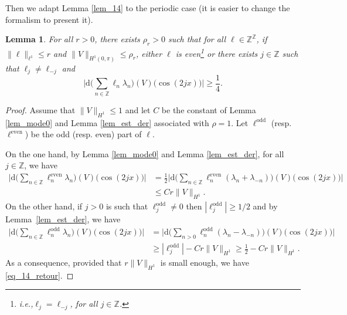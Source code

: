 \documentclass[11pt]{article}
\newcommand{\ie}{i.e.,\xspace}
\newcommand{\resp}{resp.\xspace}
\let\ts\textstyle
\newtheorem{lemma}[theorem]{Lemma}
\theoremstyle{definition}
\begin{document}
Then we adapt Lemma \ref{lem_14} to the periodic case (it is easier to change the formalism to present it).
\begin{lemma}
\label{lem_14_per}
For all $r>0$, there exists $\rho_r>0$ such that for all $\ell \in \mathbb{Z}^{\mathbb{Z}} $, if $\|\ell\|_{\ell^1}\leq r$ and $\|V\|_{H^1(0,\pi)}\leq \rho_r$, either $\ell$ is even\footnote{\ie $\ell_j=\ell_{-j}$, for all $j\in \mathbb{Z}$.} or there exists $j\in\mathbb{Z}$ such that $\ell_j \neq \ell_{-j}$ and%
\begin{equation}
\label{eq_14_retour}
\bigl|\mathrm{d}\bigl(\ts\sum_{n \in \mathbb{Z}} \ell_n \lambda_n)(V)(\cos(2jx)\bigr) \bigr| \geq \dfrac14.
\end{equation}
\end{lemma}
\begin{proof} Assume that $\|V\|_{H^1}\leq 1$ and let $C$ be the constant of Lemma \ref{lem_mode0} and Lemma \ref{lem_est_der} associated with $\rho =1$.
Let $\ell^{\mathrm{odd}}$ (\resp $\ell^{\mathrm{even}}$) be the odd (\resp even) part of $\ell$.

On the one hand, by Lemma \ref{lem_mode0} and Lemma \ref{lem_est_der}, for all $j\in \mathbb{Z}$, we have
\begin{equation*}
\begin{split}
\bigl |\mathrm{d} \bigl(\ts\sum_{n \in \mathbb{Z}} \ell_n^{\mathrm{even}} \lambda_n)(V)(\cos(2jx) \bigr) \bigr| &=\frac12 \bigl |\mathrm{d} \bigl(\ts\sum_{n \in \mathbb{Z}} \ell_n^{\mathrm{even}} (\lambda_n+\lambda_{-n}))(V)(\cos(2jx) \bigr) \bigr| \\ &\leq C r \|V\|_{H^1}.
\end{split}
\end{equation*}
On the other hand, if $j>0$ is such that $\ell^{\mathrm{odd}}_j \neq 0$ then $|\ell^{\mathrm{odd}}_j|\geq 1/2$ and by Lemma~\ref{lem_est_der}, we have
\begin{equation*}
\begin{split}
\bigl |\mathrm{d} \bigl(\ts\sum_{n \in \mathbb{Z}} \ell_n^{\mathrm{odd}} \lambda_n)(V)(\cos(2jx) \bigr) \bigr | &= \bigl |\mathrm{d} \bigl(\ts\sum_{n >0} \ell_n^{\mathrm{odd}} (\lambda_n-\lambda_{-n}))(V)(\cos(2jx) \bigr) \bigr| \\ &\geq |\ell^{\mathrm{odd}}_j | - Cr \| V\|_{H^1} \geq \frac12 - Cr \| V\|_{H^1}.
\end{split}
\end{equation*}
As a consequence, provided that $r \| V\|_{H^1}$ is small enough, we have \eqref{eq_14_retour}.
\end{proof}
\end{document}
